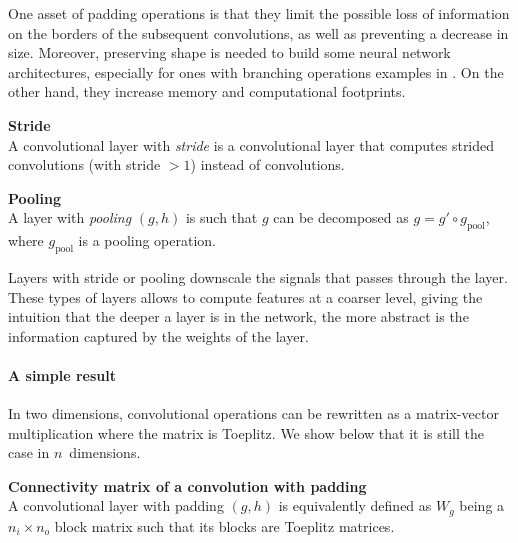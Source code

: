 \begin{remark}
One asset of padding operations is that they limit the possible loss of information on the borders of the subsequent convolutions, as well as preventing a decrease in size. Moreover, preserving shape is needed to build some neural network architectures, especially for ones with branching operations \eg examples in . On the other hand, they increase memory and computational footprints.
\end{remark}

\begin{definition}\textbf{Stride}\\
A convolutional layer with \emph{stride} is a convolutional layer that computes strided convolutions (with stride $> 1$) instead of convolutions.
\end{definition}

\begin{definition}\textbf{Pooling}\\
A layer with \textit{pooling} $(g,h)$ is such that $g$ can be decomposed as $g = g' \circ g_\text{pool}$, where $g_\text{pool}$ is a pooling operation.
\end{definition}

Layers with stride or pooling downscale the signals that passes through the layer. These types of layers allows to compute features at a coarser level, giving the intuition that the deeper a layer is in the network, the more abstract is the information captured by the weights of the layer.

\paragraph{A simple result}
In two dimensions, convolutional operations can be rewritten as a matrix-vector multiplication where the matrix is Toeplitz. We show below that it is still the case in $n$~dimensions.

\begin{proposition}\textbf{Connectivity matrix of a convolution with padding}\\
A convolutional layer with padding $(g, h)$ is equivalently defined as $W_g$ being a $n_i \times n_o$ block matrix such that its blocks are Toeplitz matrices.
\end{proposition}

